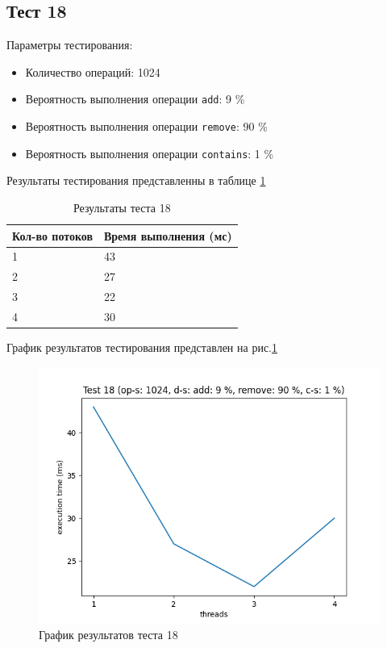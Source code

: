 \subsection*{Тест 18}

Параметры тестирования:

\begin{itemize}
    \item Количество операций: 1024
    \item Вероятность выполнения операции \verb|add|: 9 \%
    \item Вероятность выполнения операции \verb|remove|: 90 \%
    \item Вероятность выполнения операции \verb|contains|: 1 \%
\end{itemize}

Результаты тестирования представленны в таблице \ref{tab:results18}


\begin{table}[H]
    \centering
    \begin{tabular}{|l|l|}
        \hline
        Кол-во потоков & Время выполнения (мс) \\
        \hline
        1 & 43 \\
        \hline
        2 & 27 \\
        \hline
        3 & 22 \\
        \hline
        4 & 30 \\
        \hline
    \end{tabular}
    \caption{Результаты теста 18}
    \label{tab:results18}
\end{table}
        

График результатов тестирования представлен на рис.\ref{fig:plot18}

\begin{figure}[H]
    \centering
    \includegraphics[width=0.7\linewidth]{photo/plot18}
    \caption{График результатов теста 18}
    \label{fig:plot18}
\end{figure}

